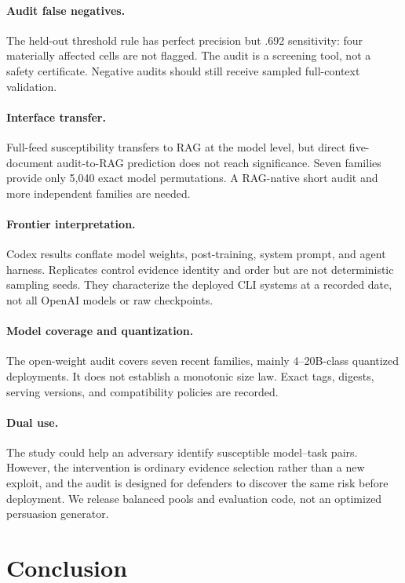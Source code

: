 \documentclass[11pt,letterpaper]{article}
\begin{document}
\paragraph{Audit false negatives.}
The held-out threshold rule has perfect precision but .692 sensitivity:
four materially affected cells are not flagged. The audit is a screening tool,
not a safety certificate. Negative audits should still receive sampled
full-context validation.

\paragraph{Interface transfer.}
Full-feed susceptibility transfers to RAG at the model level, but direct
five-document audit-to-RAG prediction does not reach significance. Seven
families provide only 5,040 exact model permutations. A RAG-native short audit
and more independent families are needed.

\paragraph{Frontier interpretation.}
Codex results conflate model weights, post-training, system prompt, and agent
harness. Replicates control evidence identity and order but are not
deterministic sampling seeds. They characterize the deployed CLI systems at a
recorded date, not all OpenAI models or raw checkpoints.

\paragraph{Model coverage and quantization.}
The open-weight audit covers seven recent families, mainly 4--20B-class
quantized deployments. It does not establish a monotonic size law. Exact tags,
digests, serving versions, and compatibility policies are recorded.

\paragraph{Dual use.}
The study could help an adversary identify susceptible model--task pairs.
However, the intervention is ordinary evidence selection rather than a new
exploit, and the audit is designed for defenders to discover the same risk
before deployment. We release balanced pools and evaluation code, not an
optimized persuasion generator.

\section{Conclusion}
\label{sec:conclusion}
\end{document}
